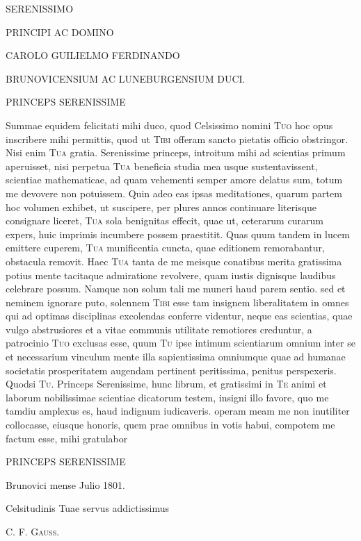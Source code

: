 \begin{center}
\textsc{SERENISSIMO}

\smallskip

\textsc{PRINCIPI AC DOMINO}

\smallskip

{\Large\textsc{CAROLO GUILIELMO FERDINANDO}}

\smallskip

\textsc{BRUNOVICENSIUM AC LUNEBURGENSIUM DUCI.}

\smallskip


\smallskip

\textsc{PRINCEPS SERENISSIME}
\end{center}

\noindent Summae equidem felicitati mihi duco, quod Celsissimo nomini \textsc{Tuo} hoc opus inscribere mihi permittis, quod ut \textsc{Tibi} offeram sancto pietatis officio obstringor. Nisi enim \textsc{Tua} gratia. Serenissime princeps, introitum mihi ad scientias primum aperuisset, nisi perpetua \textsc{Tua} beneficia studia mea usque sustentavissent, scientiae mathematicae, ad quam vehementi semper amore delatus sum, totum me devovere non potuissem. Quin adeo eas ipsas meditationes, quarum partem hoc volumen exhibet, ut suscipere, per plures annos continuare literisque consignare liceret, \textsc{Tua} sola benignitas effecit, quae ut, ceterarum curarum expers, huic imprimis incumbere possem praestitit. Quas quum tandem in lucem emittere cuperem, \textsc{Tua} munificentia cuncta, quae editionem remorabantur, obstacula removit. Haec \textsc{Tua} tanta de me meisque conatibus merita gratissima potius mente tacitaque admiratione revolvere, quam iustis dignisque laudibus celebrare possum. Namque non solum tali me muneri haud parem sentio. sed et neminem ignorare puto, solennem \textsc{Tibi} esse tam insignem liberalitatem in omnes qui ad optimas disciplinas excolendas conferre videntur, neque eas scientias, quae vulgo abstrusiores et a vitae communis utilitate remotiores creduntur, a patrocinio \textsc{Tuo} exclusas esse, quum \textsc{Tu} ipse intimum scientiarum omnium inter se et necessarium vinculum mente illa sapientissima omniumque quae ad humanae societatis prosperitatem augendam pertinent peritissima, penitus perspexeris. Quodsi \textsc{Tu}. Princeps Serenissime, hunc librum, et gratissimi in \textsc{Te} animi et laborum nobilissimae scientiae dicatorum testem, insigni illo favore, quo me tamdiu amplexus es, haud indignum iudicaveris. operam meam me non inutiliter collocasse, eiusque honoris, quem prae omnibus in votis habui, compotem me factum esse, mihi gratulabor

\begin{center}
\textsc{PRINCEPS SERENISSIME}
\end{center}

\noindent\hspace*{1.5em}Brunovici mense Julio 1801.

\smallskip
\begin{flushright}
Celsitudinis Tuae servus addictissimus

\smallskip
\textsc{C. F. Gauss.}
\end{flushright}

